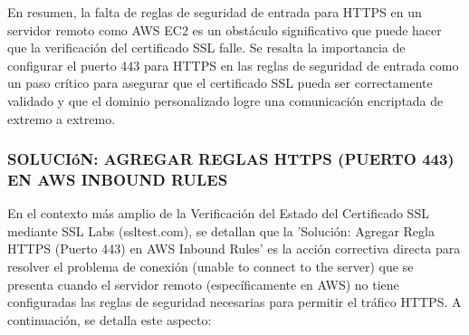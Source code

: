 \documentclass{report}
\begin{document}
En resumen, la falta de reglas de seguridad de entrada para HTTPS en un servidor remoto como AWS EC2 es un obstáculo significativo que 
puede hacer que la verificación del certificado SSL falle. Se resalta la importancia de configurar el puerto 443 para HTTPS 
en las reglas de seguridad de entrada como un paso crítico para asegurar que el certificado SSL pueda ser correctamente validado y 
que el dominio personalizado logre una comunicación encriptada de extremo a extremo.

\subsubsection{SOLUCIóN: AGREGAR REGLAS HTTPS (PUERTO 443) EN AWS INBOUND RULES}
En el contexto más amplio de la Verificación del Estado del Certificado SSL mediante SSL Labs (ssltest.com), se  
detallan que la 'Solución: Agregar Regla HTTPS (Puerto 443) en AWS Inbound Rules' es la acción correctiva directa para resolver 
el problema de conexión (unable to connect to the server) que se presenta cuando el servidor remoto (específicamente en AWS) 
no tiene configuradas las reglas de seguridad necesarias para permitir el tráfico HTTPS.
A continuación, se detalla este aspecto:
\end{document}

